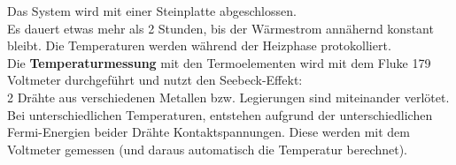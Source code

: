 \documentclass[12pt,a4paper]{article}
\begin{document}
\begin{multicols}{2}
\noindent Das System wird mit einer Steinplatte abgeschlossen.\\
Es dauert etwas mehr als 2 Stunden, bis der Wärmestrom annähernd konstant bleibt. Die Temperaturen werden während der Heizphase protokolliert.\\

\noindent Die \textbf{Temperaturmessung} mit den Termoelementen wird mit dem Fluke 179 Voltmeter durchgeführt und nutzt den Seebeck-Effekt:\\
2 Drähte aus verschiedenen Metallen bzw. Legierungen sind miteinander verlötet. Bei unterschiedlichen Temperaturen, entstehen aufgrund der unterschiedlichen Fermi-Energien beider Drähte Kontaktspannungen. Diese werden mit dem Voltmeter gemessen (und daraus automatisch die Temperatur berechnet).

\end{multicols}
\end{document}
